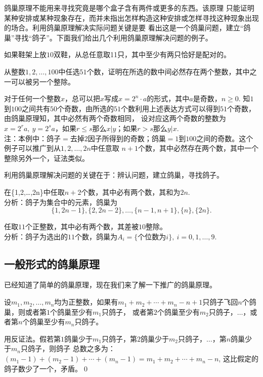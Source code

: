 鸽巢原理不能用来寻找究竟是哪个盒子含有两件或更多的东西。该原理
只能证明某种安排或某种现象存在，而并未指出怎样构造这种安排或怎样寻找这种现象出现的场合。利用鸽巢原理解决实际问题关键是要
看出这是一个鸽巢问题，建立“鸽巢”寻找“鸽子”。下面我们给出几个利用鸽巢原理解决问题的例子。
\begin{exa}
如果鞋架上放$10$双鞋，从总任意取11只，其中至少有两只恰好是配对的。
\end{exa}
\begin{exa}
从整数$1,2,\ldots,100$中任选$51$个数，证明在所选的数中间必然存在两个整数，其中之一可以被另一个整除。

\pf 对于任何一个整数$x$，总可以把$x$写成$x=2^n\cdot
a$的形式，其中$a$是奇数，$n\geq 0$.
知$1$到$100$之间共有$50$个奇数，由所选的$51$个数利用上述表达方式可以得到$51$个奇数，由鸽巢原理知，其中必然有两个奇数相同，
设对应这两个奇数的整数为$x=2^ra,\ y=2^sa$，如果$r\leq s$那么$x|y$；如果$r>s$那么$y|x$.\\
注：本例中：鸽子$=$去掉$2$因子所得到的奇数；鸽巢$=$$1$到$100$之间的奇数。这个例子可以推广到从$1,2,\ldots,2n$中任意取
$n+1$个数，其中必然存在两个数，其中一个整除另外一个，证法类似。
\end{exa}

利用鸽巢原理解决问题的关键在于：辨认问题，建立鸽巢，寻找鸽子。
\begin{exa}
在\{1,2,\ldots,2n\}中任取$n+2$个数，其中必有两个数，其和为$2n$.
\\分析：鸽子为集合中的元素，鸽巢为$$\{1,2n-1\},\{2,2n-2\},\ldots,\{n-1,n+1\},\{n\},\{2n\}.$$
\end{exa}

\begin{exa}
任取$11$个正整数，其中必有两个数，其差被$10$整除。
\\分析：鸽子为选出的$11$个数，鸽巢为$A_i=\{\mbox{个位数为}i\},\ i=0,1,\ldots,9.$
\end{exa}

\subsection{一般形式的鸽巢原理}

已经知道了简单的鸽巢原理，现在我们来了解一下推广的鸽巢原理。
\begin{thm}
设$m_1,m_2,\ldots,m_n$均为正整数，如果有$m_1+m_2+\cdots+m_n-n+1$只鸽子飞回$n$个鸽巢，则或者第$1$个鸽巢至少有$m_1$只鸽子，
或者第$2$个鸽巢至少有$m_2$只鸽子，$\ldots$，或者第$n$个鸽巢至少有$m_n$只鸽子。
\end{thm}
\pf
用反证法。假若第$1$鸽巢少于$m_1$只鸽子，第$2$鸽巢少于$m_2$只鸽子，$\ldots$，第$n$鸽巢少于$m_n$只鸽子，则鸽子
总数之多为：$(m_1-1)+(m_2-1)+\cdots+(m_n-1)=m_1+m_2+\cdots+m_n-n$,
这比假定的鸽子数少了一个，矛盾。\qed

